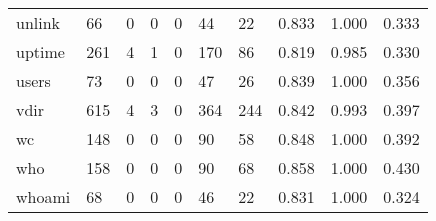 \begin{longtable}{lp{2.0cm}p{2.0cm}p{2.0cm}p{2.0cm}p{2.0cm}p{2.0cm}p{2.0cm}p{2.0cm}p{2.0cm}}
unlink    &                     66 &                                             0 &                                            0 &                                           0 &                                           44 &                                         22 &                                0.833 &                                  1.000 &                                0.333 \\
uptime    &                    261 &                                             4 &                                            1 &                                           0 &                                          170 &                                         86 &                                0.819 &                                  0.985 &                                0.330 \\
users     &                     73 &                                             0 &                                            0 &                                           0 &                                           47 &                                         26 &                                0.839 &                                  1.000 &                                0.356 \\
vdir      &                    615 &                                             4 &                                            3 &                                           0 &                                          364 &                                        244 &                                0.842 &                                  0.993 &                                0.397 \\
wc        &                    148 &                                             0 &                                            0 &                                           0 &                                           90 &                                         58 &                                0.848 &                                  1.000 &                                0.392 \\
who       &                    158 &                                             0 &                                            0 &                                           0 &                                           90 &                                         68 &                                0.858 &                                  1.000 &                                0.430 \\
whoami    &                     68 &                                             0 &                                            0 &                                           0 &                                           46 &                                         22 &                                0.831 &                                  1.000 &                                0.324 \\

\end{longtable}
